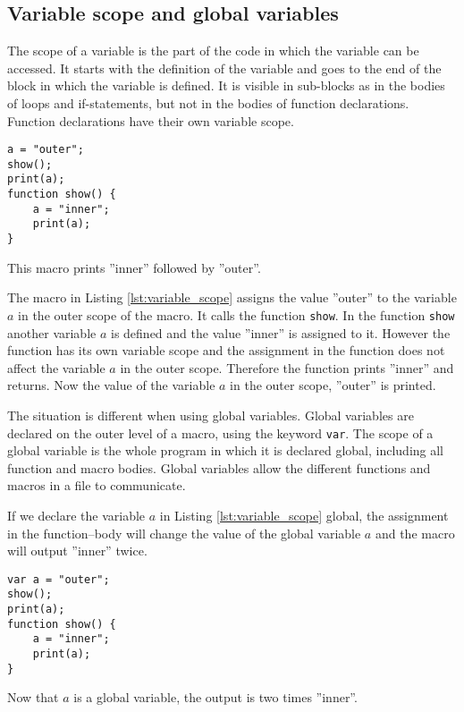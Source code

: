 \subsection{Variable scope and global variables}

The scope of a variable is the part of the code in which the variable can be accessed. It starts with the definition of the variable and goes to the end of the block in which the variable is defined. It is visible in sub-blocks as in the bodies of loops and if-statements, but not in the bodies of function declarations. Function declarations have their own variable scope.

\begin{listing}[H]
\begin{verbatim}
a = "outer";
show();
print(a);
function show() {
	a = "inner";
	print(a);
}
\end{verbatim}
\caption{This macro prints ''inner'' followed by ''outer''. }
\label{lst:variable_scope} 
\end{listing}

The macro in Listing \ref{lst:variable_scope} assigns the value ''outer'' to the variable $a$ in the outer scope of the macro. It calls the function {\tt show}. In the function {\tt show} another variable $a$ is defined and the value ''inner'' is assigned to it. However the function has its own variable scope and the assignment in the function does not affect the variable $a$ in the outer scope. Therefore the function prints ''inner'' and returns. Now the value of the variable $a$ in the outer scope, ''outer'' is printed.

The situation is different when using global variables. Global variables are declared on the outer level of a macro, using the keyword {\tt var}. The scope of a global variable is the whole program in which it is declared global, including all function and macro bodies. Global variables allow the different functions and macros in a file to communicate.

If we declare the variable $a$ in Listing \ref{lst:variable_scope} global, the assignment in the function--body will change the value of the global variable $a$ and the macro will output ''inner'' twice.

\begin{listing}[H]
\begin{verbatim}
var a = "outer";
show();
print(a);
function show() {
	a = "inner";
	print(a);
}
\end{verbatim}
\caption{Now that $a$ is a global variable, the output is two times ''inner''. }
\label{lst:variable_global} 
\end{listing}

